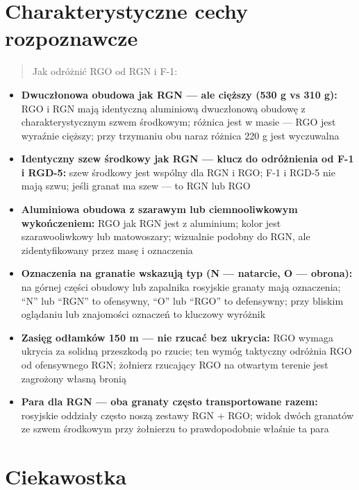 \documentclass[12pt,openany,oneside]{book}
\providecommand{\tightlist}{%
  \setlength{\itemsep}{0pt}\setlength{\parskip}{0pt}}
\begin{document}
\section{Charakterystyczne cechy
rozpoznawcze}\label{charakterystyczne-cechy-rozpoznawcze-104}

\begin{quote}
Jak odróżnić RGO od RGN i F-1:
\end{quote}

\begin{itemize}
\tightlist
\item
  \textbf{Dwuczłonowa obudowa jak RGN --- ale cięższy (530 g vs 310 g):}
  RGO i RGN mają identyczną aluminiową dwuczłonową obudowę z
  charakterystycznym szwem środkowym; różnica jest w masie --- RGO jest
  wyraźnie cięższy; przy trzymaniu obu naraz różnica 220 g jest
  wyczuwalna
\item
  \textbf{Identyczny szew środkowy jak RGN --- klucz do odróżnienia od
  F-1 i RGD-5:} szew środkowy jest wspólny dla RGN i RGO; F-1 i RGD-5
  nie mają szwu; jeśli granat ma szew --- to RGN lub RGO
\item
  \textbf{Aluminiowa obudowa z szarawym lub ciemnooliwkowym
  wykończeniem:} RGO jak RGN jest z aluminium; kolor jest
  szarawooliwkowy lub matowoszary; wizualnie podobny do RGN, ale
  zidentyfikowany przez masę i oznaczenia
\item
  \textbf{Oznaczenia na granatie wskazują typ (N --- natarcie, O ---
  obrona):} na górnej części obudowy lub zapalnika rosyjskie granaty
  mają oznaczenia; ``N'' lub ``RGN'' to ofensywny, ``O'' lub ``RGO'' to
  defensywny; przy bliskim oglądaniu lub znajomości oznaczeń to kluczowy
  wyróżnik
\item
  \textbf{Zasięg odłamków 150 m --- nie rzucać bez ukrycia:} RGO wymaga
  ukrycia za solidną przeszkodą po rzucie; ten wymóg taktyczny odróżnia
  RGO od ofensywnego RGN; żołnierz rzucający RGO na otwartym terenie
  jest zagrożony własną bronią
\item
  \textbf{Para dla RGN --- oba granaty często transportowane razem:}
  rosyjskie oddziały często noszą zestawy RGN + RGO; widok dwóch
  granatów ze szwem środkowym przy żołnierzu to prawdopodobnie właśnie
  ta para
\end{itemize}

\section{Ciekawostka}\label{ciekawostka-104}
\end{document}
